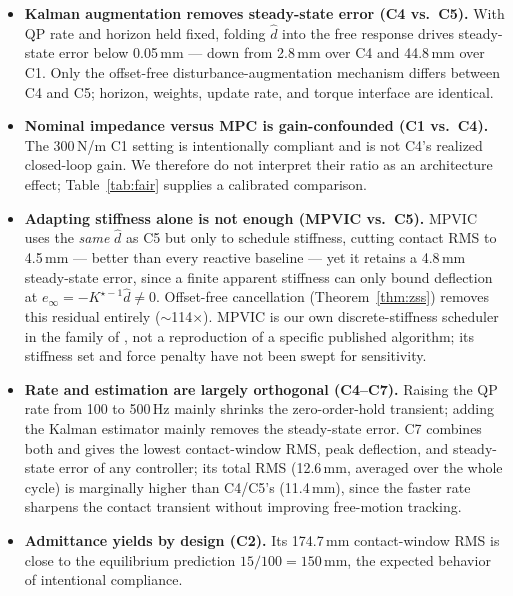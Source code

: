 \documentclass[journal]{IEEEtran}
\begin{document}
\begin{itemize}[leftmargin=*,itemsep=1pt,topsep=2pt]
\item \textbf{Kalman augmentation removes steady-state error (C4 vs.\
C5).} With QP rate and horizon held fixed, folding $\hat d$ into the
free response drives steady-state error below 0.05\,mm --- down from
2.8\,mm over C4 and 44.8\,mm over C1. Only the offset-free
disturbance-augmentation mechanism differs between C4 and C5; horizon,
weights, update rate, and torque interface are identical.
\item \textbf{Nominal impedance versus MPC is gain-confounded (C1 vs.\ C4).}
The 300\,N/m C1 setting is intentionally compliant and is not C4's realized
closed-loop gain.  We therefore do not interpret their ratio as an
architecture effect; Table~\ref{tab:fair} supplies a calibrated comparison.
\item \textbf{Adapting stiffness alone is not enough (MPVIC vs.\ C5).}
MPVIC uses the \emph{same} $\hat d$ as C5 but only to schedule
stiffness, cutting contact RMS to 4.5\,mm --- better than every
reactive baseline --- yet it retains a 4.8\,mm steady-state error,
since a finite apparent stiffness can only bound deflection at
$e_\infty=-K^{\star-1}\hat d\neq0$. Offset-free cancellation
(Theorem~\ref{thm:zss}) removes this residual entirely ($\sim$114$\times$).
MPVIC is our own discrete-stiffness scheduler in the family of
\cite{liu2025model,roveda2019optimal}, not a reproduction of a specific
published algorithm; its stiffness set and force penalty have not been
swept for sensitivity.
\item \textbf{Rate and estimation are largely orthogonal (C4--C7).}
Raising the QP rate from 100 to 500\,Hz mainly shrinks the
zero-order-hold transient; adding the Kalman estimator mainly removes
the steady-state error. C7 combines both and gives the lowest
contact-window RMS, peak deflection, and steady-state error of any
controller; its total RMS (12.6\,mm, averaged over the whole cycle) is
marginally higher than C4/C5's (11.4\,mm), since the faster rate
sharpens the contact transient without improving free-motion tracking.
\item \textbf{Admittance yields by design (C2).} Its 174.7\,mm
contact-window RMS is close to the equilibrium prediction
$15/100=150$\,mm, the expected behavior of intentional compliance.
\end{itemize}
\end{document}
